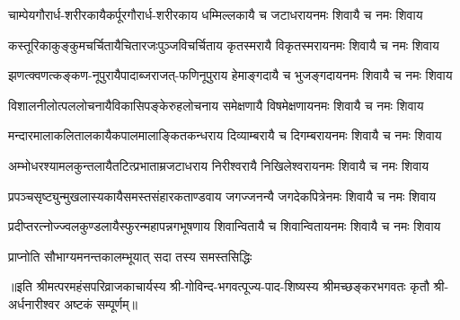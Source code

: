 

\fourlineindentedshloka
{चाम्पेयगौरार्ध-शरीरकायै}{कर्पूरगौरार्ध-शरीरकाय}
{धम्मिल्लकायै च जटाधराय}{नमः शिवायै च नमः शिवाय}

\fourlineindentedshloka
{कस्तूरिकाकुङ्कुमचर्चितायै}{चितारजःपुञ्जविचर्चिताय}
{कृतस्मरायै विकृतस्मराय}{नमः शिवायै च नमः शिवाय}

\fourlineindentedshloka
{झणत्क्वणत्कङ्कण-नूपुरायै}{पादाब्जराजत्-फणिनूपुराय}
{हेमाङ्गदायै च भुजङ्गदाय}{नमः शिवायै च नमः शिवाय}

\fourlineindentedshloka
{विशालनीलोत्पललोचनायै}{विकासिपङ्केरुहलोचनाय}
{समेक्षणायै विषमेक्षणाय}{नमः शिवायै च नमः शिवाय}

\fourlineindentedshloka
{मन्दारमालाकलितालकायै}{कपालमालाङ्कितकन्धराय}
{दिव्याम्बरायै च दिगम्बराय}{नमः शिवायै च नमः शिवाय}

\fourlineindentedshloka
{अम्भोधरश्यामलकुन्तलायै}{तटित्प्रभाताम्रजटाधराय}
{निरीश्वरायै निखिलेश्वराय}{नमः शिवायै च नमः शिवाय}

\fourlineindentedshloka
{प्रपञ्चसृष्ट्युन्मुखलास्यकायै}{समस्तसंहारकताण्डवाय}
{जगज्जनन्यै जगदेकपित्रे}{नमः शिवायै च नमः शिवाय}

\fourlineindentedshloka
{प्रदीप्तरत्नोज्ज्वलकुण्डलायै}{स्फुरन्महापन्नगभूषणाय}
{शिवान्वितायै च शिवान्विताय}{नमः शिवायै च नमः शिवाय}

{प्राप्नोति सौभाग्यमनन्तकालम्}{भूयात् सदा तस्य समस्तसिद्धिः}

{॥इति श्रीमत्परमहंसपरिव्राजकाचार्यस्य श्री-गोविन्द-भगवत्पूज्य-पाद-शिष्यस्य 
श्रीमच्छङ्करभगवतः कृतौ श्री-अर्धनारीश्वर अष्टकं सम्पूर्णम्॥}
%
%
%
